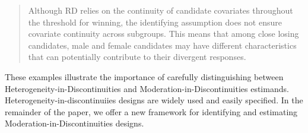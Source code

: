 \documentclass[12pt]{article}
\begin{document}
\begin{quote}
  Although RD relies on the continuity of candidate covariates throughout the threshold for winning, the identifying assumption does not ensure covariate continuity across subgroups. This means that among close losing candidates, male and female candidates may have different characteristics that can potentially contribute to their divergent responses.
\end{quote}

These examples illustrate the importance of carefully distinguishing between Heterogeneity-in-Discontinuities and Moderation-in-Discontinuities estimands. Heterogeneity-in-discontinuiies designs are widely used and easily specified. In the remainder of the paper, we offer a new framework for identifying and estimating Moderation-in-Discontinuities designs.
















\end{document}
